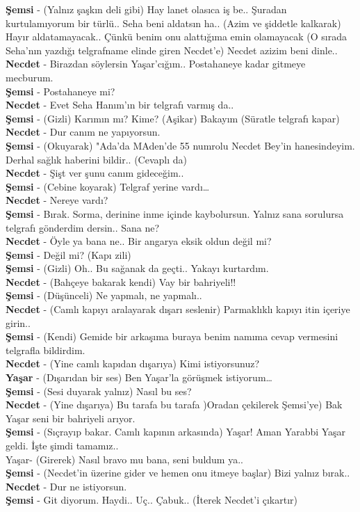 \documentclass[]{book}
\begin{document}
\textbf{Şemsi} - (Yalnız şaşkın deli gibi) Hay lanet olasıca iş be.. Şuradan kurtulamıyorum bir türlü.. Seha beni aldatsın ha.. (Azim ve şiddetle kalkarak) Hayır aldatamayacak.. Çünkü benim onu alattığıma emin olamayacak (O sırada Seha'nın yazdığı telgrafname elinde giren Necdet'e) Necdet azizim beni dinle..\\
\textbf{Necdet} - Birazdan söylersin Yaşar'cığım.. Postahaneye kadar gitmeye mecburum.\\
\textbf{Şemsi} - Postahaneye mi?\\
\textbf{Necdet} - Evet Seha Hanım'ın bir telgrafı varmış da..\\
\textbf{Şemsi} - (Gizli) Karımın mı? Kime? (Aşikar) Bakayım (Süratle telgrafı kapar)\\
\textbf{Necdet} - Dur canım ne yapıyorsun.\\
\textbf{Şemsi} - (Okuyarak) "Ada'da MAden'de 55 numrolu Necdet Bey'in hanesindeyim. Derhal sağlık haberini bildir.. (Cevaplı da)\\
\textbf{Necdet} - Şişt ver şunu canım gideceğim..\\
\textbf{Şemsi} - (Cebine koyarak) Telgraf yerine vardı\ldots{}\\
\textbf{Necdet} - Nereye vardı?\\
\textbf{Şemsi} - Bırak. Sorma, derinine inme içinde kaybolursun. Yalnız sana sorulursa telgrafı gönderdim dersin.. Sana ne?\\
\textbf{Necdet} - Öyle ya bana ne.. Bir angarya eksik oldun değil mi?\\
\textbf{Şemsi} - Değil mi? (Kapı zili)\\
\textbf{Şemsi} - (Gizli) Oh.. Bu sağanak da geçti.. Yakayı kurtardım.\\
\textbf{Necdet} - (Bahçeye bakarak kendi) Vay bir bahriyeli!!\\
\textbf{Şemsi} - (Düşünceli) Ne yapmalı, ne yapmalı..\\
\textbf{Necdet} - (Camlı kapıyı aralayarak dışarı seslenir) Parmaklıklı kapıyı itin içeriye girin..\\
\textbf{Şemsi} - (Kendi) Gemide bir arkaşıma buraya benim namıma cevap vermesini telgrafla bildirdim.\\
\textbf{Necdet} - (Yine camlı kapıdan dışarıya) Kimi istiyorsunuz?\\
\textbf{Yaşar} - (Dışarıdan bir ses) Ben Yaşar'la görüşmek istiyorum\ldots{}\\
\textbf{Şemsi} - (Sesi duyarak yalnız) Nasıl bu ses?\\
\textbf{Necdet} - (Yine dışarıya) Bu tarafa bu tarafa )Oradan çekilerek Şemsi'ye) Bak Yaşar seni bir bahriyeli arıyor.\\
\textbf{Şemsi} - (Sıçrayıp bakar. Camlı kapının arkasında) Yaşar! Aman Yarabbi Yaşar geldi. İşte şimdi tamamız..\\
Yaşar- (Girerek) Nasıl bravo mu bana, seni buldum ya..\\
\textbf{Şemsi} - (Necdet'in üzerine gider ve hemen onu itmeye başlar) Bizi yalnız bırak..\\
\textbf{Necdet} - Dur ne istiyorsun.\\
\textbf{Şemsi} - Git diyorum. Haydi.. Uç.. Çabuk.. (İterek Necdet'i çıkartır)\\
\end{document}
